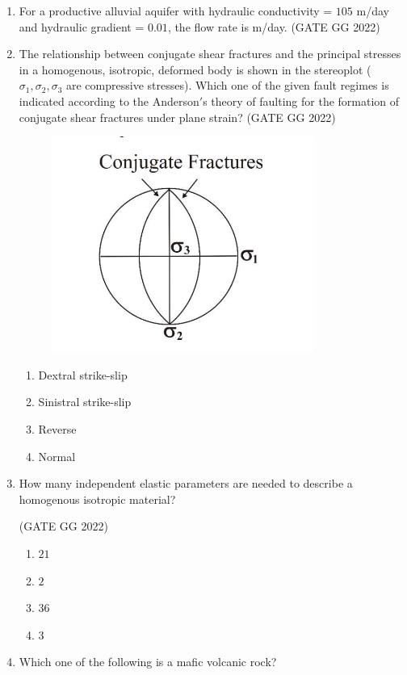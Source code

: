 \documentclass[journal]{IEEEtran}
\begin{document}
\begin{enumerate}
\item For a productive alluvial aquifer with hydraulic conductivity = $105$ m/day and hydraulic gradient = $0.01$, the flow rate is \makebox[2cm]{\hrulefill} m/day. 
\hfill(GATE GG 2022)
\vspace{0.5cm}

\item The relationship between conjugate shear fractures and the principal stresses 
in a homogenous, isotropic, deformed body is shown in the stereoplot 
($\sigma_1, \sigma_2, \sigma_3$ are compressive stresses).  Which one of the given fault regimes is indicated according to the Anderson$'$s theory of faulting for the formation of conjugate shear fractures under plane strain?
\hfill(GATE GG 2022)
\begin{figure}[H]
\centering
\includegraphics[width = 0.42\columnwidth]{figs/07.png}
\caption*{}
\label{fig:q5}
\end{figure}
\begin{multicols}{2}
\begin{enumerate}
\item Dextral strike-slip
\item Sinistral strike-slip
\item Reverse
\item Normal
\end{enumerate}
\end{multicols}

\item How many independent elastic parameters are needed to describe a homogenous isotropic material?

\hfill(GATE GG 2022)
\begin{enumerate}
\item $21$
\item $2$
\item $36$
\item $3$
\end{enumerate}

\item Which one of the following is a mafic volcanic rock?


\end{enumerate}
\end{document}
